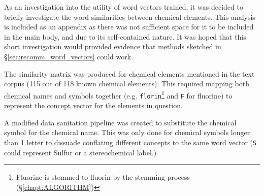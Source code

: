 As an investigation into the utility of word vectors trained, it was decided to briefly investigate the word similarities between chemical elements. This analysis is included as an appendix as there was not sufficient space for it to be included in the main body, and due to its self-contained nature. It was hoped that this short investigation would provided evidence that methods sketched in \S\ref{sec:recomm_word_vectors} could work.

The similarity matrix was produced for chemical elements mentioned in the text corpus (115 out of 118 known chemical elements). This required mapping both chemical names and symbols together (e.g. \texttt{florin}\footnote{Fluorine is stemmed to fluorin by the stemming process (\S\ref{chapt:ALGORITHM}) }  and \texttt{F} for fluorine) to represent the concept vector for the elements in question.

A modified data sanitation pipeline was created to substitute the chemical symbol for the chemical name. This was only done for chemical symbols longer than 1 letter to dissuade conflating different concepts to the same word vector (\texttt{S} could represent Sulfur or a stereochemical label.)
 

